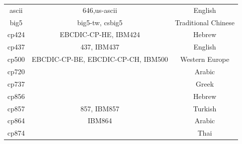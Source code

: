 \begin{center}
{\begin{tabular}{CCC}
            ascii                                                & 646,us-ascii                                                             & English                                               \\
            big5                                                 & big5-tw, csbig5                                                          & Traditional Chinese                                   \\
            cp424                                                & EBCDIC-CP-HE, IBM424                                                     & Hebrew                                                \\
            cp437                                                & 437, IBM437                                                              & English                                               \\
            cp500                                                & EBCDIC-CP-BE, EBCDIC-CP-CH, IBM500                                       & Western Europe                                        \\
            cp720                                                &                                                                          & Arabic                                                \\
            cp737                                                &                                                                          & Greek                                                 \\
            cp856                                                &                                                                          & Hebrew                                                \\
            cp857                                                & 857, IBM857                                                              & Turkish                                               \\
            cp864                                                & IBM864                                                                   & Arabic                                                \\
            cp874                                                &                                                                          & Thai                                                  \\

\end{tabular}}
\end{center}
